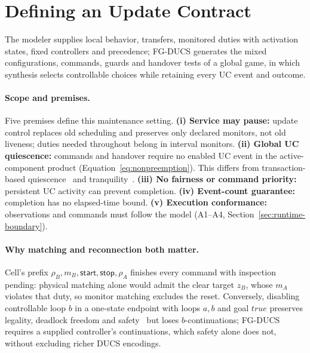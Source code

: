 \documentclass[acmsmall,screen,review,anonymous]{acmart}
\begin{document}


\section{Defining an Update Contract}
\label{sec:formalization}
\label{tab:contract-inputs}
The modeler supplies local behavior, transfers, monitored duties with activation states, fixed controllers and precedence; FG-DUCS generates the mixed configurations, commands, guards and handover tests of a global game, in which synthesis selects controllable choices while retaining every UC event and outcome.

\paragraph{Scope and premises.}\label{sec:scope-premises}
Five premises define this maintenance setting. \textbf{(i) Service may pause:} update control replaces old scheduling and preserves only declared monitors, not old liveness; duties needed throughout belong in interval monitors. \textbf{(ii) Global UC quiescence:} commands and handover require no enabled UC event in the active-component product (Equation~\eqref{eq:nonpreemption}). This differs from transaction-based quiescence~\cite{KramerMagee1990Quiescence} and tranquility~\cite{VandewoudeEtAl2007Tranquility}. \textbf{(iii) No fairness or command priority:} persistent UC activity can prevent completion. \textbf{(iv) Event-count guarantee:} completion has no elapsed-time bound. \textbf{(v) Execution conformance:} observations and commands must follow the model (A1--A4, Section~\ref{sec:runtime-boundary}).




\paragraph{Why matching and reconnection both matter.}
Cell's prefix $\rho_B,m_B,\mathsf{start},\mathsf{stop},\rho_A$ finishes every command with inspection pending: physical matching alone would admit the clear target $z_B$, whose $m_A$ violates that duty, so monitor matching excludes the reset. Conversely, disabling controllable loop $b$ in a one-state endpoint with loops $a,b$ and goal $\mathit{true}$ preserves legality, deadlock freedom and safety~\cite[Defs.~3.9--3.10, 4.3]{Nahabedian2020} but loses $b$-continuations; FG-DUCS requires a supplied controller's continuations, which safety alone does not, without excluding richer DUCS encodings.
\end{document}

